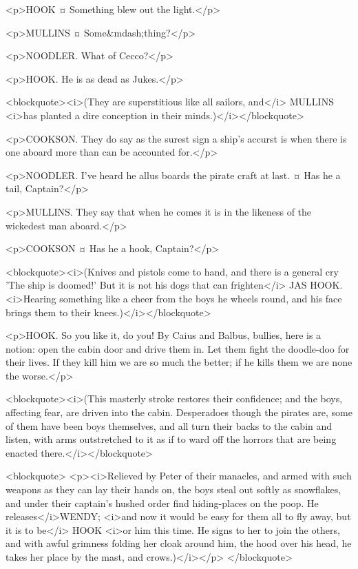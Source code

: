 <p>HOOK ¤
Something blew out the light.</p>

<p>MULLINS ¤
Some&mdash;thing?</p>

<p>NOODLER. What of Cecco?</p>

<p>HOOK. He is as dead as Jukes.</p>

<blockquote><i>(They are superstitious like all sailors, and</i> MULLINS <i>has planted a dire conception in their minds.)</i></blockquote>

<p>COOKSON. They do say as the surest sign a ship's accurst is when there is one aboard more than can be accounted for.</p>

<p>NOODLER. I've heard he allus boards the pirate craft at last.
¤
Has he a tail, Captain?</p>

<p>MULLINS. They say that when he comes it is in the likeness of the wickedest man aboard.</p>

<p>COOKSON ¤
Has he a hook, Captain?</p>

<blockquote><i>(Knives and pistols come to hand, and there is a general cry 'The ship is doomed!' But it is not his dogs that can frighten</i> JAS HOOK. <i>Hearing something like a cheer from the boys he wheels round, and his face brings them to their knees.)</i></blockquote>

<p>HOOK. So you like it, do you! By Caius and Balbus, bullies, here is a notion: open the cabin door and drive them in. Let them fight the doodle-doo for their lives. If they kill him we are so much the better; if he kills them we are none the worse.</p>

<blockquote><i>(This masterly stroke restores their confidence; and the boys, affecting fear, are driven into the cabin. Desperadoes though the pirates are, some of them have been boys themselves, and all turn their backs to the cabin and listen, with arms outstretched to it as if to ward off the horrors that are being enacted there.</i></blockquote>

<blockquote> <p><i>Relieved by Peter of their manacles, and armed with such weapons as they can lay their hands on, the boys steal out softly as snowflakes, and under their captain's hushed order find hiding-places on the poop. He releases</i>WENDY; <i>and now it would be easy for them all to fly away, but it is to be</i> HOOK <i>or him this time. He signs to her to join the others, and with awful grimness folding her cloak around him, the hood over his head, he takes her place by the mast, and crows.)</i></p> </blockquote>

